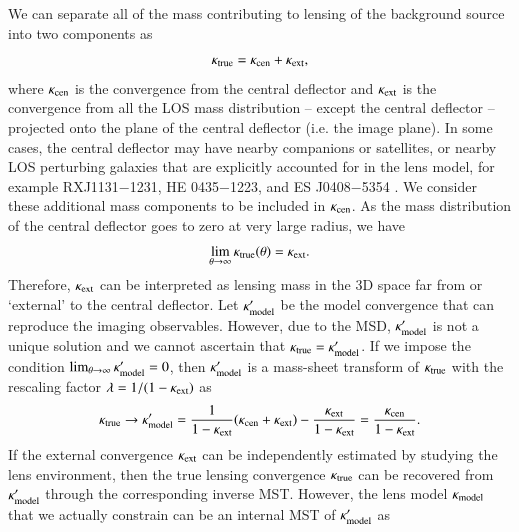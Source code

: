 \documentclass[longauth]{aa}
\newcommand{\ajs}[1]{{{#1}}}
\newcommand{\kw}[1]{{{#1}}}
\begin{document}
We can separate all of the mass contributing to lensing of the background source into two components as
%
\begin{equation}
        \kappa_{\rm true} = \kappa_{\rm cen} + \kappa_{\rm ext},
\end{equation}
%
where $\kappa_{\rm cen}$ is the convergence %
from the central deflector and $\kappa_{\rm ext}$ is the convergence from all the LOS mass distribution -- except the central deflector -- projected onto the plane of the central deflector (i.e. the image plane). \ajs{In some cases, the central deflector may have nearby companions or satellites, or nearby LOS perturbing galaxies that are explicitly accounted for in the lens model, for example RXJ1131$-$1231, HE 0435$-$1223, and ES J0408$-$5354 \citep{Suyu13, Wong17, Shajib20}. We consider these additional mass components to be included in $\kappa_{\rm cen}$.} As the mass distribution of the central deflector goes to zero at very large radius, we have 
%
\begin{equation} \label{eq:true_kappa}
        \lim_{\theta \to \infty} \kappa_{\rm true} (\theta) = \kappa_{\rm ext}.   
\end{equation}
%
Therefore, $\kappa_{\rm ext}$ can be interpreted as lensing mass in the 3D space far from or `external' to the central deflector. Let $\kappa_{\rm model}^{\prime}$ be the model convergence that can reproduce the imaging observables. However, due to the MSD, $\kappa_{\rm model}^{\prime}$ is not a unique solution and we cannot ascertain that $\kappa_{\rm true} = \kappa_{\rm model}^{\prime}$. If we impose the condition $\lim_{\theta \to \infty} \kappa_{\rm model}^{\prime} = 0$, then $\kappa_{\rm model}^{\prime}$ is a mass-sheet transform of $\kappa_{\rm true}$ with the rescaling factor $\lambda = 1/(1 - \kappa_{\rm ext})$ as
%
\begin{equation} \label{eq:external_mst}
        \kappa_{\rm true} \to \kappa'_{\rm model} = \frac{1}{1-\kappa_{\rm ext}}(\kappa_{\rm cen} + \kappa_{\rm ext}) - \frac{\kappa_{\rm ext}}{1 - \kappa_{\rm ext}} = \frac{\kappa_{\rm cen}}{1 - \kappa_{\rm ext}}.
\end{equation}
%
If the external convergence $\kappa_{\rm ext}$ can be independently estimated by studying the lens environment, then the true lensing convergence $\kappa_{\rm true}$ can be recovered from $\kappa_{\rm model}^{\prime}$ through the corresponding inverse MST. However, the lens model $\kappa_{\rm model}$ that we actually constrain can be an internal MST of $\kappa_{\rm model}^{\prime}$ as
\end{document}
